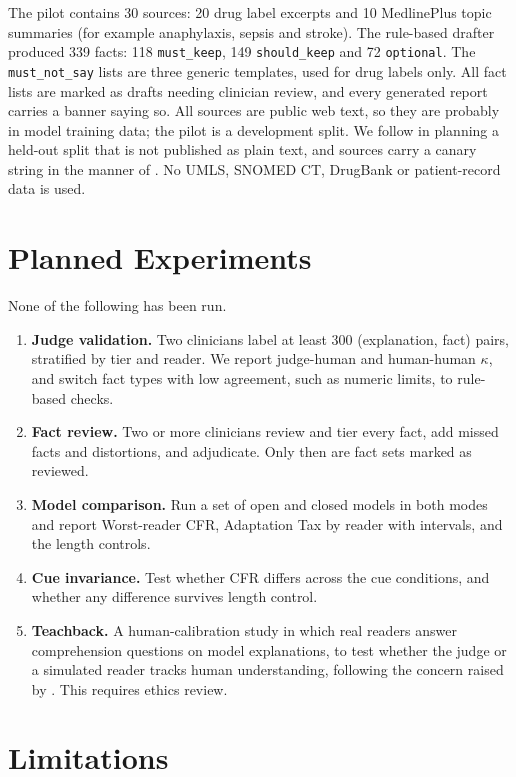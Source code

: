 \documentclass[11pt]{article}
\begin{document}
The pilot contains 30 sources: 20 drug label excerpts and 10 MedlinePlus topic summaries (for example anaphylaxis, sepsis and stroke). The rule-based drafter produced 339 facts: 118 \texttt{must\_keep}, 149 \texttt{should\_keep} and 72 \texttt{optional}. The \texttt{must\_not\_say} lists are three generic templates, used for drug labels only. All fact lists are marked as drafts needing clinician review, and every generated report carries a banner saying so. All sources are public web text, so they are probably in model training data; the pilot is a development split. We follow \citet{jacovi2023stop} in planning a held-out split that is not published as plain text, and sources carry a canary string in the manner of \citet{srivastava2023bigbench}. No UMLS, SNOMED CT, DrugBank or patient-record data is used.

\section{Planned Experiments}

None of the following has been run.
\begin{enumerate}
\item \textbf{Judge validation.} Two clinicians label at least 300 (explanation, fact) pairs, stratified by tier and reader. We report judge-human and human-human $\kappa$, and switch fact types with low agreement, such as numeric limits, to rule-based checks.
\item \textbf{Fact review.} Two or more clinicians review and tier every fact, add missed facts and distortions, and adjudicate. Only then are fact sets marked as reviewed.
\item \textbf{Model comparison.} Run a set of open and closed models in both modes and report Worst-reader CFR, Adaptation Tax by reader with intervals, and the length controls.
\item \textbf{Cue invariance.} Test whether CFR differs across the cue conditions, and whether any difference survives length control.
\item \textbf{Teachback.} A human-calibration study in which real readers answer comprehension questions on model explanations, to test whether the judge or a simulated reader tracks human understanding, following the concern raised by \citet{bean2026reliability}. This requires ethics review.
\end{enumerate}

\section{Limitations}
\end{document}

